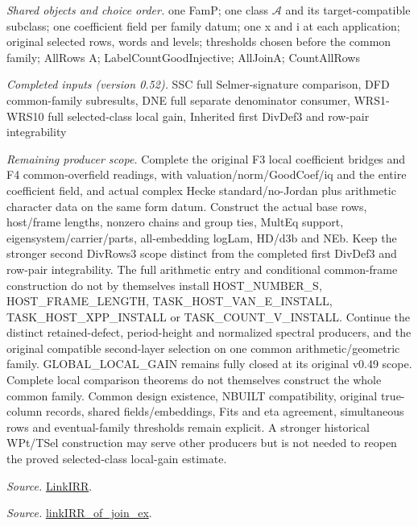 \documentclass[11pt,a4paper]{article}
\numberwithin{equation}{section}
\theoremstyle{remark}\newtheorem{remark}[theorem]{Remark}
\begin{document}
\emph{Shared objects and choice order.} one FamP; one class $\mathcal A$ and its target-compatible subclass; one coefficient field per family datum; one x and i at each application; original selected rows, words and levels; thresholds chosen before the common family; AllRows A; LabelCountGoodInjective; AllJoinA; CountAllRows

\emph{Completed inputs (version 0.52).} SSC full Selmer-signature comparison, DFD common-family subresults, DNE full separate denominator consumer, WRS1-WRS10 full selected-class local gain, Inherited first DivDef3 and row-pair integrability

\emph{Remaining producer scope.} Complete the original F3 local coefficient bridges and F4 common-overfield readings, with valuation/norm/GoodCoef/iq and the entire coefficient field, and actual complex Hecke standard/no-Jordan plus arithmetic character data on the same form datum. Construct the actual base rows, host/frame lengths, nonzero chains and group ties, MultEq support, eigensystem/carrier/parts, all-embedding logLam, HD/d3b and NEb. Keep the stronger second DivRows3 scope distinct from the completed first DivDef3 and row-pair integrability. The full arithmetic entry and conditional common-frame construction do not by themselves install HOST\_\allowbreak NUMBER\_\allowbreak S, HOST\_\allowbreak FRAME\_\allowbreak LENGTH, TASK\_\allowbreak HOST\_\allowbreak VAN\_\allowbreak E\_\allowbreak INSTALL, TASK\_\allowbreak HOST\_\allowbreak XPP\_\allowbreak INSTALL or TASK\_\allowbreak COUNT\_\allowbreak V\_\allowbreak INSTALL. Continue the distinct retained-defect, period-height and normalized spectral producers, and the original compatible second-layer selection on one common arithmetic/geometric family. GLOBAL\_\allowbreak LOCAL\_\allowbreak GAIN remains fully closed at its original v0.49 scope. Complete local comparison theorems do not themselves construct the whole common family. Common design existence, NBUILT compatibility, original true-column records, shared fields/embeddings, Fits and eta agreement, simultaneous rows and eventual-family thresholds remain explicit. A stronger historical WPt/TSel construction may serve other producers but is not needed to reopen the proved selected-class local-gain estimate.

\emph{Source.} \href{https://github.com/CocoSgt/riemann-hypothesis-lean/blob/7cbf7a0c32fca1badf05931879a37c3f8a2b03b4/src/Formalism/SharpRestriction/GlobalTheoremInputs.lean#L55-L58}{LinkIRR}.

\emph{Source.} \href{https://github.com/CocoSgt/riemann-hypothesis-lean/blob/7cbf7a0c32fca1badf05931879a37c3f8a2b03b4/src/Development/AbelianVarietyTheory/Proofs/GlobalInterpolation/LinkIRROfJoinEx.lean#L17-L38}{linkIRR\_\allowbreak of\_\allowbreak join\_\allowbreak ex}.
\end{document}
